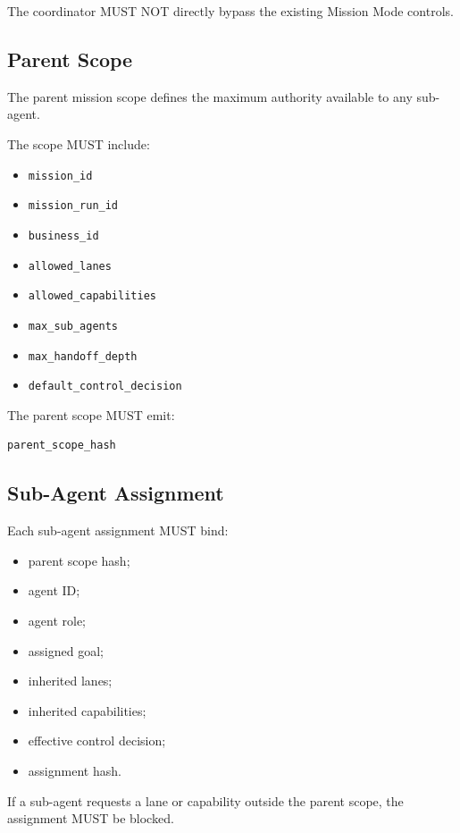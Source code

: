 The coordinator MUST NOT directly bypass the existing Mission Mode controls.

\subsection{Parent Scope}

The parent mission scope defines the maximum authority available to any sub-agent.

The scope MUST include:

\begin{itemize}
  \item \texttt{mission\_id}
  \item \texttt{mission\_run\_id}
  \item \texttt{business\_id}
  \item \texttt{allowed\_lanes}
  \item \texttt{allowed\_capabilities}
  \item \texttt{max\_sub\_agents}
  \item \texttt{max\_handoff\_depth}
  \item \texttt{default\_control\_decision}
\end{itemize}

The parent scope MUST emit:

\begin{verbatim}
parent_scope_hash
\end{verbatim}

\subsection{Sub-Agent Assignment}

Each sub-agent assignment MUST bind:

\begin{itemize}
  \item parent scope hash;
  \item agent ID;
  \item agent role;
  \item assigned goal;
  \item inherited lanes;
  \item inherited capabilities;
  \item effective control decision;
  \item assignment hash.
\end{itemize}

If a sub-agent requests a lane or capability outside the parent scope, the assignment MUST be blocked.


